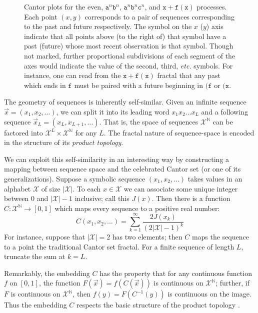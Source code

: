 \documentclass[sigconf, anonymous, review]{acmart}
\begin{document}
\begin{figure}[h]
  \caption{ Cantor plots for the even, $\mathtt{a}^n\mathtt{b}^n$,
    $\mathtt{a}^n\mathtt{b}^n\mathtt{c}^n$, and $\mathtt{x+f(x)}$ processes.
    Each point $(x,y)$ corresponds to a pair of sequences corresponding to the
    past and future respectively. The symbol on the $x$ ($y$) axis indicate that
    all points above (to the right of) that symbol have a past (future) whose
    most recent observation is that symbol. Though not marked, further
    proportional subdivisions of each segment of the axes would indicate the
    value of the second, third, \emph{etc.} symbols. For instance, one can read
    from the $\mathtt{x+f(x)}$ fractal that any past which ends in $\mathtt{f}$
    must be paired with a future beginning in $\mathtt{(f}$ or $\mathtt{(x}$. }
    \label{fig:cantor}
\end{figure}

The geometry of sequences is inherently self-similar. Given an infinite sequence
$\overrightarrow{x} = (x_1,x_2,\dots)$, we can split it into its leading word
$x_1 x_2 \dots x_L$ and a following sequence $\overrightarrow{x}_L =
(x_L,x_{L+1},\dots)$. That is, the space of sequences $\mathcal{X}^\mathbb{N}$
can be factored into $\mathcal{X}^L\times \mathcal{X}^\mathbb{N}$ for any $L$.
The fractal nature of sequence-space is encoded in the structure of its
\emph{product topology}.

We can exploit this self-similarity in an interesting way by constructing a
mapping between sequence space and the celebrated Cantor set (or one of its
generalizations). Suppose a symbolic sequence $(x_1,x_2,\dots)$ takes values in
an alphabet $\mathcal{X}$ of size $|\mathcal{X}|$. To each $x\in\mathcal{X}$ we
can associate some unique integer between $0$ and $|\mathcal{X}|-1$ inclusive;
call this $J(x)$. Then there is a function $C:\mathcal{X}^\mathbb{N}\rightarrow
[0,1]$ which maps every sequence to a positive real number:
\begin{equation}
  C(x_1,x_2,\dots) = \sum_{k=1}^\infty \frac{2J(x_k)}{(2|\mathcal{X}|-1)^k}
\end{equation}
For instance, suppose that $|\mathcal{X}|=2$ has two elements; then $C$ maps the
sequence to a point the traditional Cantor set fractal. For a finite sequence of
length $L$, truncate the sum at $k=L$.

Remarkably, the embedding $C$ has the property that for any continuous function
$f$ on $[0,1]$, the function $F(\overrightarrow{x}) = f(C(\overrightarrow{x}))$
is continuous on $\mathcal{X}^\mathbb{N}$; further, if $F$ is continuous on
$\mathcal{X}^\mathbb{N}$, then $f(y) = F(C^{-1}(y))$ is continuous on the image.
Thus the embedding $C$ respects the basic structure of the product topology
\cite{Kurk03a}.
\end{document}
